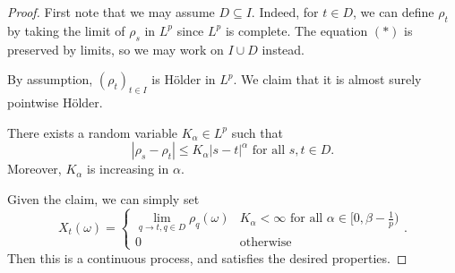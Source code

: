 \documentclass[a4paper]{article}
\begin{document}
\begin{proof}
  First note that we may assume $D \subseteq I$. Indeed, for $t \in D$, we can define $\rho_t$ by taking the limit of $\rho_s$ in $L^p$ since $L^p$ is complete. The equation $(*)$ is preserved by limits, so we may work on $I \cup D$ instead.

  By assumption, $(\rho_t)_{t \in I}$ is H\"older in $L^p$. We claim that it is almost surely pointwise H\"older.
  \begin{claim}
    There exists a random variable $K_\alpha \in L^p$ such that
    \[
      |\rho_s - \rho_t| \leq K_\alpha |s - t|^\alpha\text{ for all }s, t \in D.
    \]
    Moreover, $K_\alpha$ is increasing in $\alpha$.
  \end{claim}
  Given the claim, we can simply set 
  \[
    X_t(\omega) =
    \begin{cases}
      \lim_{q \to t, q \in D} \rho_q(\omega) & K_\alpha < \infty\text{ for all }\alpha \in [0, \beta - \frac{1}{p})\\
      0 & \text{otherwise}
    \end{cases}.
  \]
  Then this is a continuous process, and satisfies the desired properties.


\end{proof}
\end{document}
